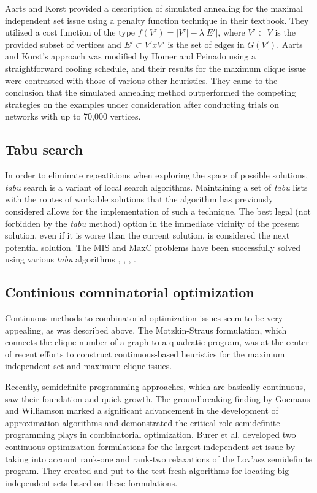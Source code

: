 Aarts and Korst \cite{ak89} provided a description of simulated annealing for the maximal independent set issue using a penalty function technique in their textbook. They utilized a cost function of the type $f(V') = |V'| - \lambda |E'|$, where $V' \subset V$ is the provided subset of vertices and $E' \subset V' x V'$ is the set of edges in $G(V')$. Aarts and Korst's approach was modified by Homer and Peinado \cite{hp96} using a straightforward cooling schedule, and their results for the maximum clique issue were contrasted with those of various other heuristics. They came to the conclusion that the simulated annealing method outperformed the competing strategies on the examples under consideration after conducting trials on networks with up to 70,000 vertices.

\subsection{Tabu search}

In order to eliminate repeatitions when exploring the space of possible solutions, \textit{tabu} search is a variant of local search algorithms.
Maintaining a set of \textit{tabu} lists with the routes of workable solutions that the algorithm has previously considered allows for the implementation of such a technique. The best legal (not forbidden by the \textit{tabu} method) option in the immediate vicinity of the present solution, even if it is worse than the current solution, is considered the next potential solution.
The MIS and MaxC problems have been successfully solved using various \textit{tabu} algorithms \cite{bp01}, \cite{fhw89}, \cite{ms99}, \cite{ss82}.

\subsection{Continious comninatorial optimization}
Continuous methods to combinatorial optimization issues seem to be very appealing, as was described above. The Motzkin-Straus formulation, which connects the clique number of a graph to a quadratic program, was at the center of recent efforts to construct continuous-based heuristics for the maximum independent set and maximum clique issues.

Recently, semidefinite programming approaches, which are basically continuous, saw their foundation and quick growth. The groundbreaking finding by Goemans and Williamson marked a significant advancement in the development of approximation algorithms and demonstrated the critical role semidefinite programming plays in combinatorial optimization. Burer et al. developed two continuous optimization formulations for the largest independent set issue by taking into account rank-one and rank-two relaxations of the Lov'asz semidefinite program.
They created and put to the test fresh algorithms for locating big independent sets based on these formulations.

